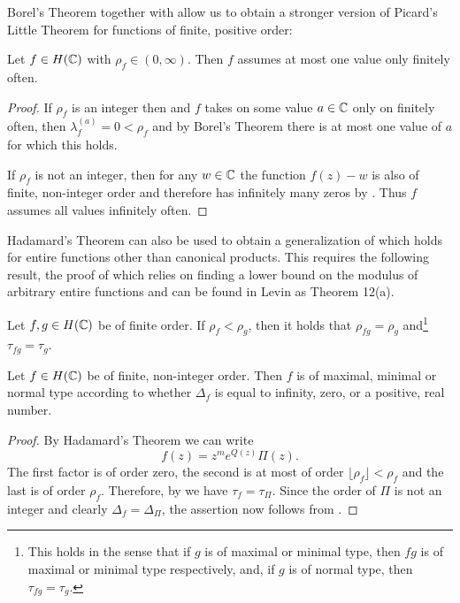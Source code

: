 Borel's Theorem together with  allow us to obtain a stronger version of Picard's Little Theorem for functions of finite, positive order:

\begin{corollary}
    Let $f \in H(\mathbb{C})$ with $\rho_f \in (0, \infty)$. Then $f$ assumes at most one value only finitely often.
\end{corollary}

\begin{proof}
    If $\rho_f$ is an integer then and $f$ takes on some value $a \in \mathbb{C}$ only on finitely often, then $\lambda_f^{(a)} = 0 < \rho_f$ and by Borel's Theorem there is at most one value of $a$ for which this holds.

    If $\rho_f$ is not an integer, then for any $w \in \mathbb{C}$ the function $f(z) - w$ is also of finite, non-integer order and therefore has infinitely many zeros by . Thus $f$ assumes all values infinitely often.
\end{proof}

Hadamard's Theorem can also be used to obtain a generalization of  which holds for entire functions other than canonical products. This requires the following result, the proof of which relies on finding a lower bound on the modulus of arbitrary entire functions and can be found in Levin \cite{levin-distribution-of-zeros} as Theorem 12(a).

\begin{proposition} \label{prop:order-type-product-equality}
    Let $f, g \in H(\mathbb{C})$ be of finite order. If $\rho_f < \rho_g$, then it holds that $ \rho_{fg} = \rho_g $ and\footnote{This holds in the sense that if $g$ is of maximal or minimal type, then $fg$ is of maximal or minimal type respectively, and, if $g$ is of normal type, then $\tau_{fg} = \tau_g$.} $\tau_{fg} = \tau_g$.
\end{proposition}

\begin{theorem} \label{thm:entire-function-type-density}
    Let $f \in H(\mathbb{C})$ be of finite, non-integer order. Then $f$ is of maximal, minimal or normal type according to whether $\Delta_f$ is equal to infinity, zero, or a positive, real number.
\end{theorem}

\begin{proof}
    By Hadamard's Theorem we can write
    $$ f(z) = z^m e^{Q(z)} \Pi(z). $$
    The first factor is of order zero, the second is at most of order $\lfloor \rho_f \rfloor < \rho_f$ and the last is of order $\rho_f$. Therefore, by  we have  $\tau_f = \tau_\Pi$. Since the order of $\Pi$ is not an integer and clearly $\Delta_f = \Delta_\Pi$, the assertion now follows from .
\end{proof}

